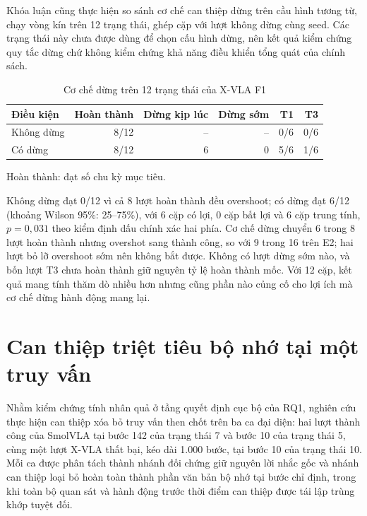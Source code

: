 Khóa luận cũng thực hiện so sánh cơ chế can thiệp dừng trên cầu hình tương từ, chạy vòng kín trên 12 trạng thái, ghép cặp với lượt không dừng cùng seed. Các trạng thái này chưa được dùng để chọn cấu hình dừng, nên kết quả kiểm chứng quy tắc dừng chứ không kiểm chứng khả năng điều khiển tổng quát của chính sách.

\begin{table}[htbp]
\centering\small
\caption{Cơ chế dừng trên 12 trạng thái của X-VLA F1}
\label{tab:halt-seen12}
\begin{tabular}{l|r|r|r|r|r}
\toprule
\textbf{Điều kiện} & \textbf{Hoàn thành} & \textbf{Dừng kịp lúc} & \textbf{Dừng sớm} & \textbf{T1} & \textbf{T3} \\
\midrule
Không dừng & 8/12 & -- & -- & 0/6 & 0/6 \\
Có dừng & 8/12 & 6 & 0 & 5/6 & 1/6 \\
\bottomrule
\end{tabular}
\par\smallskip
{\footnotesize *Hoàn thành: đạt số chu kỳ mục tiêu.\par}
\end{table}

Không dừng đạt 0/12 vì cả 8 lượt hoàn thành đều overshoot; có dừng đạt 6/12 (khoảng Wilson 95\%: 25--75\%), với 6 cặp có lợi, 0 cặp bất lợi và 6 cặp trung tính, $p = 0{,}031$ theo kiểm định dấu chính xác hai phía. Cơ chế dừng chuyển 6 trong 8 lượt hoàn thành nhưng overshot sang thành công, so với 9 trong 16 trên E2; hai lượt bỏ lỡ overshoot sớm nên không bắt được. Không có lượt dừng sớm nào, và bốn lượt T3 chưa hoàn thành giữ nguyên tỷ lệ hoàn thành mốc. Với 12 cặp, kết quả mang tính thăm dò nhiều hơn nhưng cũng phần nào củng cố cho lợi ích mà cơ chế dừng hành động mang lại.

\section{Can thiệp triệt tiêu bộ nhớ tại một truy vấn}
\label{sec:e45-one-query}

Nhằm kiểm chứng tính nhân quả ở tầng quyết định cục bộ của RQ1, nghiên cứu thực hiện can thiệp xóa bỏ truy vấn then chốt trên ba ca đại diện: hai lượt thành công của SmolVLA tại bước 142 của trạng thái 7 và bước 10 của trạng thái 5, cùng một lượt X-VLA thất bại, kéo dài 1.000 bước, tại bước 10 của trạng thái 10. Mỗi ca được phân tách thành nhánh đối chứng giữ nguyên lời nhắc gốc và nhánh can thiệp loại bỏ hoàn toàn thành phần văn bản bộ nhớ tại bước chỉ định, trong khi toàn bộ quan sát và hành động trước thời điểm can thiệp được tái lập trùng khớp tuyệt đối.


